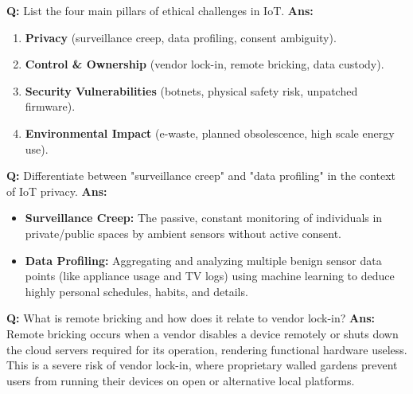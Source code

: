 \documentclass[10pt,a4paper,twocolumn]{article}
\begin{document}
\begin{tcolorbox}[
  colback=white,
  colframe=UnitColorTen,
  colbacktitle=gray!10!white,
  coltitle=black,
  fonttitle=\bfseries\sffamily\small,
  title={Unit X $\bullet$ Card 6},
  boxrule=1.2pt,
  arc=2mm,
  outer arc=2mm,
  boxsep=1.5mm,
  top=1mm,
  bottom=1mm,
  left=1.5mm,
  right=1.5mm,
  before skip=2.5mm,
  after skip=2.5mm
]
\textbf{Q:} List the four main pillars of ethical challenges in IoT.
\tcbline
\textbf{Ans:} \begin{enumerate}
  \item \textbf{Privacy} (surveillance creep, data profiling, consent ambiguity).
  \item \textbf{Control \& Ownership} (vendor lock-in, remote bricking, data custody).
  \item \textbf{Security Vulnerabilities} (botnets, physical safety risk, unpatched firmware).
  \item \textbf{Environmental Impact} (e-waste, planned obsolescence, high scale energy use).
\end{enumerate}
\end{tcolorbox}


\begin{tcolorbox}[
  colback=white,
  colframe=UnitColorTen,
  colbacktitle=gray!10!white,
  coltitle=black,
  fonttitle=\bfseries\sffamily\small,
  title={Unit X $\bullet$ Card 7},
  boxrule=1.2pt,
  arc=2mm,
  outer arc=2mm,
  boxsep=1.5mm,
  top=1mm,
  bottom=1mm,
  left=1.5mm,
  right=1.5mm,
  before skip=2.5mm,
  after skip=2.5mm
]
\textbf{Q:} Differentiate between "surveillance creep" and "data profiling" in the context of IoT privacy.
\tcbline
\textbf{Ans:} \begin{itemize}
  \item \textbf{Surveillance Creep:} The passive, constant monitoring of individuals in private/public spaces by ambient sensors without active consent.
  \item \textbf{Data Profiling:} Aggregating and analyzing multiple benign sensor data points (like appliance usage and TV logs) using machine learning to deduce highly personal schedules, habits, and details.
\end{itemize}
\end{tcolorbox}


\begin{tcolorbox}[
  colback=white,
  colframe=UnitColorTen,
  colbacktitle=gray!10!white,
  coltitle=black,
  fonttitle=\bfseries\sffamily\small,
  title={Unit X $\bullet$ Card 8},
  boxrule=1.2pt,
  arc=2mm,
  outer arc=2mm,
  boxsep=1.5mm,
  top=1mm,
  bottom=1mm,
  left=1.5mm,
  right=1.5mm,
  before skip=2.5mm,
  after skip=2.5mm
]
\textbf{Q:} What is remote bricking and how does it relate to vendor lock-in?
\tcbline
\textbf{Ans:} Remote bricking occurs when a vendor disables a device remotely or shuts down the cloud servers required for its operation, rendering functional hardware useless. This is a severe risk of vendor lock-in, where proprietary walled gardens prevent users from running their devices on open or alternative local platforms.
\end{tcolorbox}
\end{document}
